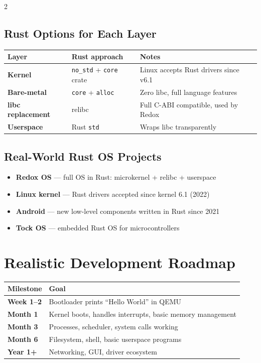 2\documentclass[11pt,a4paper]{article}
\begin{document}
\subsection{Rust Options for Each Layer}

\begin{center}
\begin{tabular}{>{\bfseries}p{3cm} p{4cm} p{5cm}}
\toprule
\rowcolor{tablehead} Layer & Rust approach & Notes \\
\midrule
Kernel           & \texttt{no\_std} + \texttt{core} crate & Linux accepts Rust drivers since v6.1 \\
Bare-metal        & \texttt{core} + \texttt{alloc}          & Zero libc, full language features \\
libc replacement  & relibc                         & Full C-ABI compatible, used by Redox \\
Userspace         & Rust \texttt{std}               & Wraps libc transparently \\
\bottomrule
\end{tabular}
\end{center}

\subsection{Real-World Rust OS Projects}
\begin{itemize}[noitemsep]
  \item \textbf{Redox OS} --- full OS in Rust: microkernel + relibc + userspace
  \item \textbf{Linux kernel} --- Rust drivers accepted since kernel 6.1 (2022)
  \item \textbf{Android} --- new low-level components written in Rust since 2021
  \item \textbf{Tock OS} --- embedded Rust OS for microcontrollers
\end{itemize}

\section{Realistic Development Roadmap}

\begin{center}
\begin{tabular}{>{\bfseries}p{3cm} p{9.5cm}}
\toprule
\rowcolor{tablehead} Milestone & Goal \\
\midrule
Week 1--2   & Bootloader prints ``Hello World'' in QEMU \\
Month 1     & Kernel boots, handles interrupts, basic memory management \\
Month 3     & Processes, scheduler, system calls working \\
Month 6     & Filesystem, shell, basic userspace programs \\
Year 1+     & Networking, GUI, driver ecosystem \\
\bottomrule
\end{tabular}
\end{center}
\end{document}
